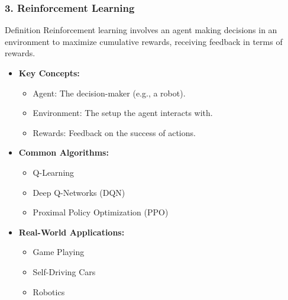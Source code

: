 \documentclass[aspectratio=169]{beamer}
\begin{document}
\begin{frame}[fragile]
    \frametitle{3. Reinforcement Learning}
    \begin{block}{Definition}
        Reinforcement learning involves an agent making decisions in an environment to maximize cumulative rewards, receiving feedback in terms of rewards.
    \end{block}
    
    \begin{itemize}
        \item \textbf{Key Concepts:}
        \begin{itemize}
            \item Agent: The decision-maker (e.g., a robot).
            \item Environment: The setup the agent interacts with.
            \item Rewards: Feedback on the success of actions.
        \end{itemize}
        
        \item \textbf{Common Algorithms:}
        \begin{itemize}
            \item Q-Learning
            \item Deep Q-Networks (DQN)
            \item Proximal Policy Optimization (PPO)
        \end{itemize}
        
        \item \textbf{Real-World Applications:}
        \begin{itemize}
            \item Game Playing
            \item Self-Driving Cars
            \item Robotics
        \end{itemize}
    \end{itemize}
\end{frame}
\end{document}
